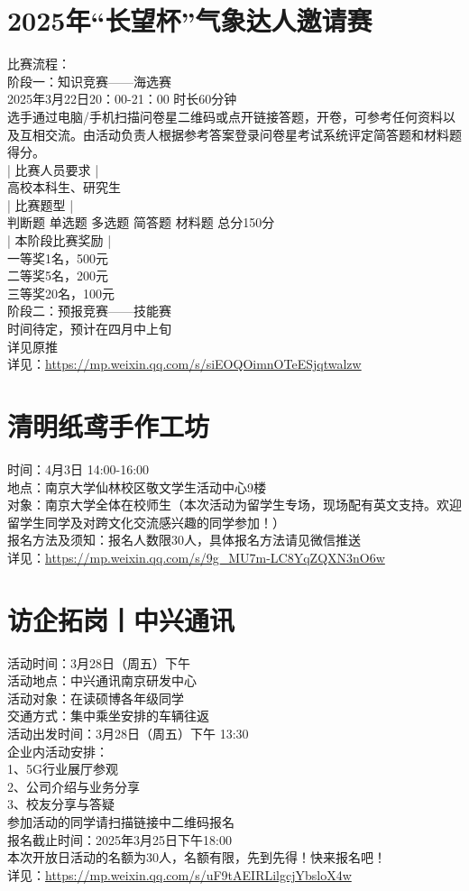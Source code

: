 \documentclass[letterpaper, 12pt]{article}
\begin{document}
\begin{multicols}{2}
\section{2025年“长望杯”气象达人邀请赛}
比赛流程：
\\阶段一：知识竞赛——海选赛
\\2025年3月22日20：00-21：00 时长60分钟
\\选手通过电脑/手机扫描问卷星二维码或点开链接答题，开卷，可参考任何资料以及互相交流。由活动负责人根据参考答案登录问卷星考试系统评定简答题和材料题得分。
\\| 比赛人员要求 |
\\高校本科生、研究生
\\| 比赛题型 |
\\判断题 单选题 多选题 简答题 材料题 总分150分
\\| 本阶段比赛奖励 |
\\一等奖1名，500元
\\二等奖5名，200元
\\三等奖20名，100元
\\阶段二：预报竞赛——技能赛
\\时间待定，预计在四月中上旬
\\详见原推
\\详见：\url{https://mp.weixin.qq.com/s/siEOQOimnOTeESjqtwalzw}

\section{清明纸鸢手作工坊}
时间：4月3日 14:00-16:00\\
地点：南京大学仙林校区敬文学生活动中心9楼\\
对象：南京大学全体在校师生（本次活动为留学生专场，现场配有英文支持。欢迎留学生同学及对跨文化交流感兴趣的同学参加！）\\
报名方法及须知：报名人数限30人，具体报名方法请见微信推送\\
详见：\url{https://mp.weixin.qq.com/s/9g_MU7m-LC8YqZQXN3nO6w}

\section{访企拓岗丨中兴通讯}
活动时间：3月28日（周五）下午
\\活动地点：中兴通讯南京研发中心
\\活动对象：在读硕博各年级同学
\\交通方式：集中乘坐安排的车辆往返
\\活动出发时间：3月28日（周五）下午 13:30
\\企业内活动安排：
\\1、5G行业展厅参观
\\2、公司介绍与业务分享
\\3、校友分享与答疑
\\参加活动的同学请扫描链接中二维码报名
\\报名截止时间：2025年3月25日下午18:00
\\本次开放日活动的名额为30人，名额有限，先到先得！快来报名吧！
\\详见：\url{https://mp.weixin.qq.com/s/uF9tAEIRLilgcjYbsloX4w}


\end{multicols}
\end{document}
